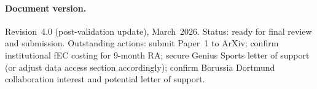 \paragraph{Document version.}
Revision~4.0 (post-validation update), March~2026. Status: ready for final review and submission. Outstanding actions: submit Paper~1 to ArXiv; confirm institutional fEC costing for 9-month RA; secure Genius Sports letter of support (or adjust data access section accordingly); confirm Borussia Dortmund collaboration interest and potential letter of support.
